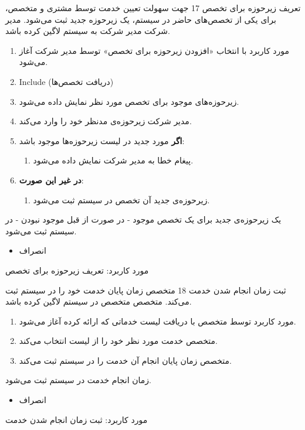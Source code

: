 {
\usecase
{تعریف زیرحوزه برای تخصص}
{17}
{جهت سهولت تعیین خدمت توسط مشتری و متخصص، برای یکی از تخصص‌های حاضر در سیستم، یک زیرحوزه جدید ثبت می‌شود.}
{مدیر شرکت}
{}
{مدیر شرکت به سیستم لاگین کرده باشد.}
{
	\vspace*{-0.6cm}
	\begin{enumerate}
		\item 
		مورد کاربرد با انتخاب «افزودن زیرحوزه برای تخصص» توسط مدیر شرکت آغاز می‌شود.
		\item Include (دریافت تخصص‌ها)
		\item زیرحوزه‌های موجود برای تخصص مورد نظر نمایش داده می‌شود.
		\item مدیر شرکت زیرحوزه‌ی مدنظر خود را وارد می‌کند. 
		\item
		\textbf{اگر}
		مورد جدید در لیست زیرحوزه‌ها موجود باشد:
		\begin{enumerate}[label=\theenumi.\arabic*.]
			\item پیغام خطا به مدیر شرکت نمایش داده می‌شود.
		\end{enumerate}
		\item
		\textbf{در غیر این صورت}:
		\begin{enumerate}[label=\theenumi.\arabic*.]
			\item زیرحوزه‌ی جدید آن تخصص در سیستم ثبت می‌شود.
		\end{enumerate}		
	\end{enumerate}
}
{یک زیرحوزه‌ی جدید برای یک تخصص موجود - در صورت از قبل موجود نبودن - در سیستم ثبت می‌شود.}
{
	\begin{itemize}
		\vspace*{-0.6cm}
		\item انصراف
	\end{itemize}
}
{
	مورد کاربرد: تعریف زیرحوزه برای تخصص
}

}


{
\usecase
{ثبت زمان انجام شدن خدمت}
{18}
{متخصص زمان پایان خدمت خود را در سیستم ثبت می‌کند.}
{متخصص}
{}
{متخصص در سیستم لاگین کرده باشد.}
{
	\vspace*{-0.6cm}
	\begin{enumerate}
		\item مورد کاربرد توسط متخصص با دریافت لیست خدماتی که ارائه کرده آغاز می‌شود.
		\item متخصص خدمت مورد نظر خود را از لیست انتخاب می‌کند.
		\item متخصص زمان پایان انجام آن خدمت را در سیستم ثبت می‌کند.
	\end{enumerate}
}
{زمان انجام خدمت در سیستم ثبت می‌شود.}
{
	\begin{itemize}
		\vspace*{-0.6cm}
		\item انصراف
	\end{itemize}
}
{
	مورد کاربرد: ثبت زمان انجام شدن خدمت
}

}

